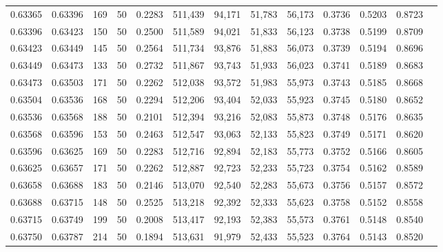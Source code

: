 \begin{tabular}{rrrrrrrrrrrrr}
0.63365 & 0.63396 &   169 &  50 &                                     0.2283 & 511,439 &  94,171 &  51,783 &  56,173 & 0.3736 & 0.5203 & 0.8723 \\
0.63396 & 0.63423 &   150 &  50 &                                     0.2500 & 511,589 &  94,021 &  51,833 &  56,123 & 0.3738 & 0.5199 & 0.8709 \\
0.63423 & 0.63449 &   145 &  50 &                                     0.2564 & 511,734 &  93,876 &  51,883 &  56,073 & 0.3739 & 0.5194 & 0.8696 \\
0.63449 & 0.63473 &   133 &  50 &                                     0.2732 & 511,867 &  93,743 &  51,933 &  56,023 & 0.3741 & 0.5189 & 0.8683 \\
0.63473 & 0.63503 &   171 &  50 &                                     0.2262 & 512,038 &  93,572 &  51,983 &  55,973 & 0.3743 & 0.5185 & 0.8668 \\
0.63504 & 0.63536 &   168 &  50 &                                     0.2294 & 512,206 &  93,404 &  52,033 &  55,923 & 0.3745 & 0.5180 & 0.8652 \\
0.63536 & 0.63568 &   188 &  50 &                                     0.2101 & 512,394 &  93,216 &  52,083 &  55,873 & 0.3748 & 0.5176 & 0.8635 \\
0.63568 & 0.63596 &   153 &  50 &                                     0.2463 & 512,547 &  93,063 &  52,133 &  55,823 & 0.3749 & 0.5171 & 0.8620 \\
0.63596 & 0.63625 &   169 &  50 &                                     0.2283 & 512,716 &  92,894 &  52,183 &  55,773 & 0.3752 & 0.5166 & 0.8605 \\
0.63625 & 0.63657 &   171 &  50 &                                     0.2262 & 512,887 &  92,723 &  52,233 &  55,723 & 0.3754 & 0.5162 & 0.8589 \\
0.63658 & 0.63688 &   183 &  50 &                                     0.2146 & 513,070 &  92,540 &  52,283 &  55,673 & 0.3756 & 0.5157 & 0.8572 \\
0.63688 & 0.63715 &   148 &  50 &                                     0.2525 & 513,218 &  92,392 &  52,333 &  55,623 & 0.3758 & 0.5152 & 0.8558 \\
0.63715 & 0.63749 &   199 &  50 &                                     0.2008 & 513,417 &  92,193 &  52,383 &  55,573 & 0.3761 & 0.5148 & 0.8540 \\
0.63750 & 0.63787 &   214 &  50 &                                     0.1894 & 513,631 &  91,979 &  52,433 &  55,523 & 0.3764 & 0.5143 & 0.8520 \\

\end{tabular}
